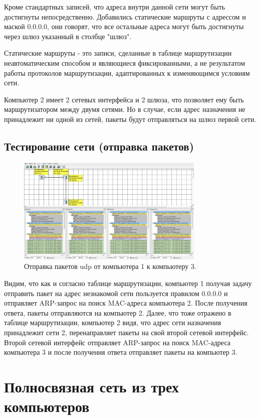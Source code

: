 \documentclass[12pt,onecolumn]{article}
\begin{document}
\begin{itemize}
Кроме стандартных записей, что адреса внутри данной сети могут быть достигнуты непосредственно. 
Добавились статические маршруты с адрессом и маской 0.0.0.0, они говорят, что все остальные адреса могут быть достигнуты через шлюз указанный в столбце "шлюз".

Статические маршруты - это записи, сделанные в таблице маршрутизации неавтоматическим способом и являющиеся фиксированными, а не результатом работы протоколов маршрутизации, адаптированных к изменяющимся условиям сети.

Компьютер 2 имеет 2 сетевых интерфейса и 2 шлюза, что позволяет ему быть маршрутизатором между двумя сетями.
Но в случае, если адрес назначения не принадлежит ни одной из сетей, пакеты будут отправляться на шлюз первой сети.

\subsection{Тестирование сети (отправка пакетов)}
\begin{figure}[H]
  \centering
  \includegraphics[width=0.8\textwidth]{image/udp-linear-topo.png}
  \caption{Отправка пакетов udp от компьютера 1 к компьютеру 3.}
\end{figure}

Видим, что как и согласно таблице маршрутизации, компьютер 1 получая задачу отправить пакет на адрес незнакомой сети пользуется правилом 0.0.0.0 и отправляет ARP-запрос на поиск MAC-адреса компьютера 2. После получения ответа, пакеты отправляются на компьютер 2.
Далее, что тоже отражено в таблице маршрутизации, компьютер 2 видя, что адрес сети назначения принадлежит сети 2, перенаправляет пакеты на свой второй сетевой интерфейс. Второй сетевой интерфейс отправляет ARP-запрос на поиск MAC-адреса компьютера 3 и после получения ответа отправляет пакеты на компьютер 3.
\end{itemize}

\section{Полносвязная сеть из трех компьютеров}
\end{document}
